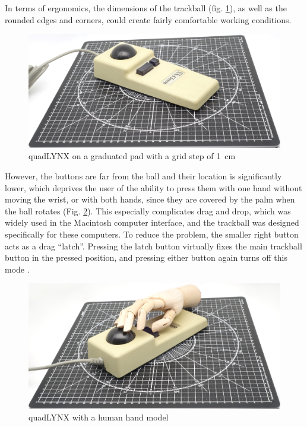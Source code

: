\documentclass[11pt, a4paper]{article}
\begin{document}
In terms of ergonomics, the dimensions of the trackball (fig. \ref{fig:quadLYNXSize}), as well as the rounded edges and corners, could create fairly comfortable working conditions.

\begin{figure}[h]
    \centering
    \includegraphics[scale=0.4]{1986_honeywell_asher_quadlynx_trackball/size_30.jpg}
    \caption{quadLYNX on a graduated pad with a grid step of 1~cm}
    \label{fig:quadLYNXSize}
\end{figure}

However, the buttons are far from the ball and their location is significantly lower, which deprives the user of the ability to press them with one hand without moving the wrist, or with both hands, since they are covered by the palm when the ball rotates (Fig. \ref{fig:quadLYNXHand}). This especially complicates drag and drop, which was widely used in the Macintosh computer interface, and the trackball was designed specifically for these computers. To reduce the problem, the smaller right button acts as a drag ``latch''. Pressing the latch button virtually fixes the main trackball button in the pressed position, and pressing either button again turns off this mode \cite{bible}.

\begin{figure}[h]
    \centering
    \includegraphics[scale=0.4]{1986_honeywell_asher_quadlynx_trackball/hand_30.jpg}
    \caption{quadLYNX with a human hand model}
    \label{fig:quadLYNXHand}
\end{figure}
\end{document}
